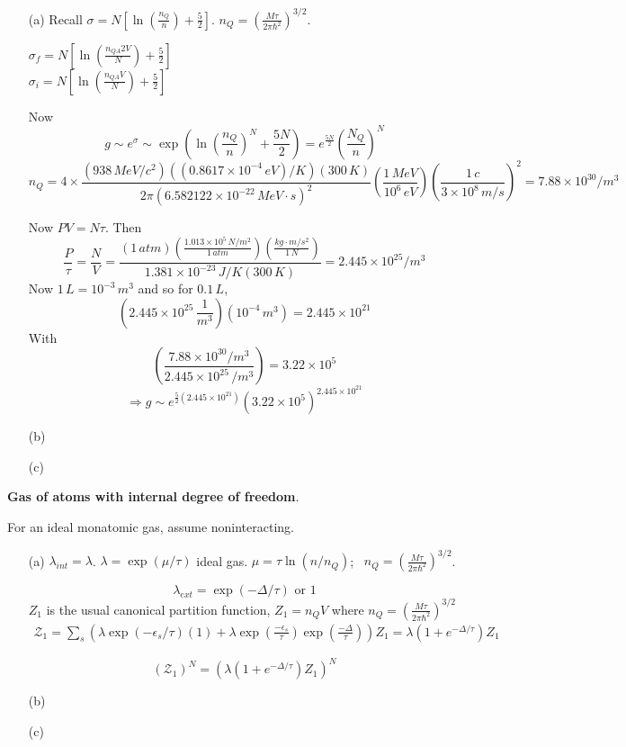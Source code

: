 \documentclass[twoside]{amsart}
\theoremstyle{plain}
\theoremstyle{definition}
\newcommand{\solutionhead}[1]
  {
   \noindent{\small\bf Solution #1.}
   }
\begin{document}
\begin{itemize}
\item[(a)] Recall $\sigma = N [ \ln{ \left( \frac{ n_Q}{ n} \right)  + \frac{5}{2}  }]$.  $n_Q = \left( \frac{ M \tau}{2\pi \hbar^2} \right)^{3/2}$.  

$\sigma_f = N [ \ln{ \left( \frac{ n_{QA} 2 V }{ N} \right) + \frac{5}{2} } ]$ \\
$\sigma_i = N [ \ln{ \left( \frac{n_{QA} V}{N} \right) + \frac{5}{2} } ]$

Now
\[
g \sim e^{\sigma} \sim \exp{ \left( \ln{ \left( \frac{n_Q}{n} \right)^N} + \frac{5N}{2} \right)} = e^{\frac{5N}{2}} \left( \frac{N_Q}{n} \right)^N
\]
\[
n_Q = 4 \times \frac{ (938 \, MeV/c^2)( (0.8617 \times 10^{-4} \, eV)/K)(300 \, K) }{ 2 \pi (6.582122 \times 10^{-22} \, MeV \cdot s )^2 } \left( \frac{ 1 \, MeV}{ 10^6 \, eV } \right) \left( \frac{ 1 \, c }{ 3\times 10^8 \, m/s } \right)^2 = 7.88 \times 10^{30}/m^3
\]

Now $PV = N\tau$.  Then
\[
\frac{ P}{\tau} = \frac{N}{V} = \frac{ ( 1 \, atm )( \frac{ 1.013 \times 10^5 \, N/m^2 }{ 1 \, atm} ) \left( \frac{ kg \cdot m/s^2 }{ 1 \, N } \right) }{ 1.381 \times 10^{-23} \, J/K  (300 \, K ) } = 2.445 \times 10^{25} / m^3
\]
Now $1 \, L = 10^{-3} \, m^3$ and so for $0.1 \, L$, 
\[
(2.445 \times 10^{25} \, \frac{1}{m^3} ) ( 10^{-4}\, m^3 ) = 2.445 \times 10^{21} 
\]
With 
\[
\left( \frac{ 7.88 \times 10^{30} / m^3}{ 2.445 \times 10^{25} \, /m^3 } \right) = 3.22 \times 10^5
\]
\[
\Longrightarrow g \sim e^{ \frac{5}{2} ( 2.445 \times 10^{21} ) } (3.22 \times 10^5 )^{2.445 \times 10^{21} }
\]
\item[(b)]
\item[(c)]
\end{itemize}






\solutionhead{9} \textbf{Gas of atoms with internal degree of freedom}.  

For an ideal monatomic gas, assume noninteracting.  
\begin{itemize}
\item[(a)] $\lambda_{int} = \lambda$.   $\lambda = \exp{(\mu /\tau)}$ ideal gas.  $\mu = \tau \ln{ ( n/n_Q)}$; \quad \, $n_Q = \left( \frac{ M\tau}{ 2 \pi \hbar^2} \right)^{3/2}$.  

\[
\boxed{ \lambda_{ext} = \exp{ (-\Delta/\tau)} \text{ or } 1  }
\]
$Z_1$ is the usual canonical partition function, $Z_1 = n_Q V$ where $n_Q = \left( \frac{M\tau}{ 2 \pi \hbar^2 } \right)^{3/2}$  
\[
\begin{gathered}
  \mathcal{Z}_1 = \sum_s ( \lambda \exp{ ( - \epsilon_s/\tau) } (1) + \lambda \exp{ \left( \frac{-\epsilon_s}{\tau} \right)} \exp{ \left( \frac{ - \Delta }{\tau} \right) } )Z_1  = \lambda ( 1 + e^{-\Delta/\tau } ) Z_1
\end{gathered}
\]

\[
( \mathcal{Z}_1 )^N = (\lambda ( 1 + e^{-\Delta/\tau} )Z_1)^N 
\]
\item[(b)]
\item[(c)]
\end{itemize}
\end{document}
